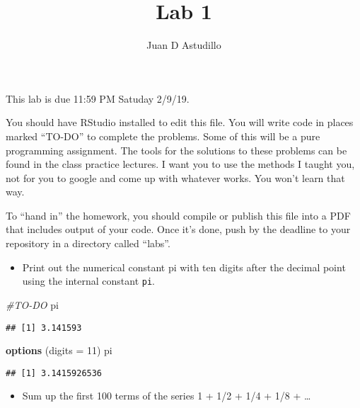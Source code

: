 \documentclass[]{article}
\title{Lab 1}
\author{Juan D Astudillo}
\date{}
\newenvironment{Shaded}{\begin{snugshade}}{\end{snugshade}}
\newcommand{\KeywordTok}[1]{\textcolor[rgb]{0.13,0.29,0.53}{\textbf{#1}}}
\newcommand{\DataTypeTok}[1]{\textcolor[rgb]{0.13,0.29,0.53}{#1}}
\newcommand{\DecValTok}[1]{\textcolor[rgb]{0.00,0.00,0.81}{#1}}
\newcommand{\CommentTok}[1]{\textcolor[rgb]{0.56,0.35,0.01}{\textit{#1}}}
\newcommand{\NormalTok}[1]{#1}
\providecommand{\tightlist}{%
  \setlength{\itemsep}{0pt}\setlength{\parskip}{0pt}}
\begin{document}
\maketitle

This lab is due 11:59 PM Satuday 2/9/19.

You should have RStudio installed to edit this file. You will write code
in places marked ``TO-DO'' to complete the problems. Some of this will
be a pure programming assignment. The tools for the solutions to these
problems can be found in the class practice lectures. I want you to use
the methods I taught you, not for you to google and come up with
whatever works. You won't learn that way.

To ``hand in'' the homework, you should compile or publish this file
into a PDF that includes output of your code. Once it's done, push by
the deadline to your repository in a directory called ``labs''.

\begin{itemize}
\tightlist
\item
  Print out the numerical constant pi with ten digits after the decimal
  point using the internal constant \texttt{pi}.
\end{itemize}

\begin{Shaded}
\begin{Highlighting}[]
\CommentTok{#TO-DO}
\NormalTok{pi}
\end{Highlighting}
\end{Shaded}

\begin{verbatim}
## [1] 3.141593
\end{verbatim}

\begin{Shaded}
\begin{Highlighting}[]
\KeywordTok{options}\NormalTok{ (}\DataTypeTok{digits =} \DecValTok{11}\NormalTok{)}
\NormalTok{pi}
\end{Highlighting}
\end{Shaded}

\begin{verbatim}
## [1] 3.1415926536
\end{verbatim}

\begin{itemize}
\tightlist
\item
  Sum up the first 100 terms of the series 1 + 1/2 + 1/4 + 1/8 +
  \ldots{}
\end{itemize}
\end{document}
